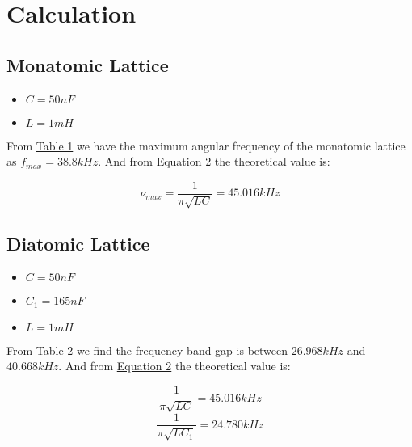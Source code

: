 \section{Calculation}
	\subsection{Monatomic Lattice}
		\begin{itemize}
			\item $C = 50nF$
			\item $L = 1mH$
		\end{itemize}

		From \hyperref[tab:mono]{Table 1} we have the maximum angular frequency of the monatomic lattice as $f_{max} = 38.8kHz$. And from \hyperref[eqn:2]{Equation 2} the theoretical value is:

		$$\nu_{max} = \frac{1}{\pi\sqrt{LC}} = 45.016kHz$$

	\subsection{Diatomic Lattice}
		\begin{itemize}
			\item $C = 50nF$
			\item $C_1 = 165nF$
			\item $L = 1mH$
		\end{itemize}

		From \hyperref[tab:di]{Table 2} we find the frequency band gap is between $26.968kHz$ and $40.668kHz$. And from \hyperref[eqn:2]{Equation 2} the theoretical value is:

		$$\frac{1}{\pi\sqrt{LC}} = 45.016kHz$$
		$$\frac{1}{\pi\sqrt{LC_1}} = 24.780kHz$$